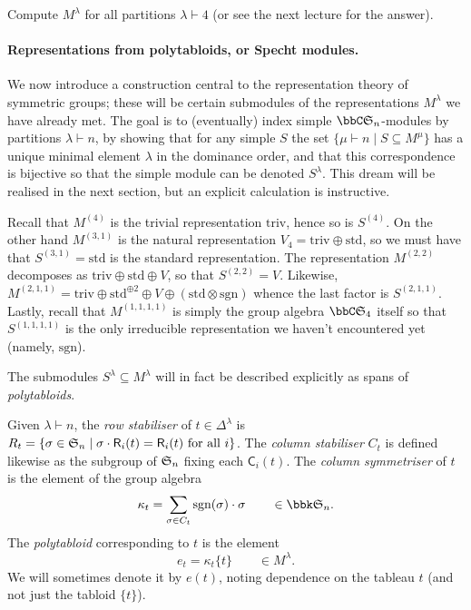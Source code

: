 \begin{exercise}
    Compute $M^\lambda$ for all partitions $\lambda\vdash 4$ (or see the next
    lecture for the answer).
\end{exercise}

\paragraph{Representations from polytabloids, or Specht modules.} We now
introduce a construction central to the representation theory of symmetric
groups; these will be certain submodules of the representations
$M^\lambda$ we have already met. The goal is to (eventually) index simple $\bbC \sym n$-modules by partitions $\lambda\vdash n$, by showing
that for any simple $S$ the set $\{\mu\vdash n \;|\; S \subseteq M^\mu\}$ has a
unique minimal element $\lambda$ in the dominance order, and that this
correspondence is bijective so that the simple module can be denoted
$S^\lambda$. This dream will be realised in the next section, but an explicit
calculation is instructive.

\begin{example}
    Recall that $M^{(4)}$ is the trivial representation $\text{triv}$, hence so
    is $S^{(4)}$. On the other hand $M^{(3,1)}$ is the natural representation
    $V_4=\text{triv}\oplus\text{std}$, so we must have that
    $S^{(3,1)}=\text{std}$ is the standard representation. The representation $M^{(2,2)}$ decomposes as $\text{triv}\oplus \text{std}\oplus V$, so
    that $S^{(2,2)}=V$. Likewise, $M^{(2,1,1)}=\text{triv}\oplus
    \text{std}^{\oplus 2} \oplus V \oplus (\text{std}\otimes \text{sgn})$ whence
    the last factor is $S^{(2,1,1)}$. Lastly, recall that $M^{(1,1,1,1)}$ is
    simply the group algebra $\bbC \sym{4}$ itself so that $S^{(1,1,1,1)}$ is
    the only irreducible representation we haven't encountered yet (namely,
    $\text{sgn}$).
\end{example}

The submodules $S^\lambda\subseteq M^\lambda$ will in fact be described explicitly
as spans of \emph{polytabloids}.

\begin{definition}
    Given $\lambda\vdash n$, the \emph{row stabiliser} of $t\in \Delta^\lambda$
    is $R_t=\{\sigma\in \mathfrak{S}_{n}\;|\; \sigma \cdot
    \mathsf{R}_i(t)=\mathsf{R}_i(t)\text{ for all }i\}$. The \emph{column stabiliser} 
    $C_t$ is defined likewise as the subgroup of $\mathfrak{S}_{n}$ fixing each $\mathsf{C}_i(t)$.
    The \emph{column symmetriser} of $t$ is the element of the group algebra \[\kappa_t = \sum_{\sigma\in
    C_t}\text{sgn}(\sigma)\cdot \sigma \qquad \in \bbk \sym n.\] 
    The \emph{polytabloid} corresponding to $t$ is the element
    \[e_t=\kappa_t\{t\}\qquad \in M^\lambda.\] We will sometimes denote it by $e(t)$,
    noting dependence on the tableau $t$ (and not just the tabloid
    $\{t\}$).

\end{definition}


